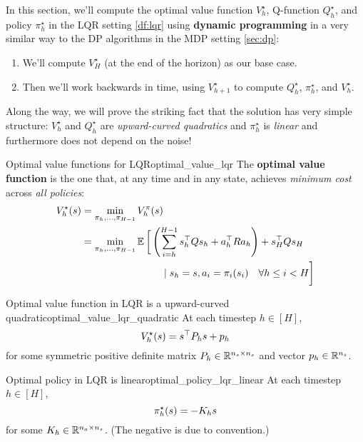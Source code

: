\documentclass[\main/main]{subfiles}
\begin{document}
In this section, we'll compute the optimal value function $V^\star_h$, Q-function $Q^\star_h$, and policy $\pi^\star_h$ in the LQR setting \eqref{df:lqr} using \textbf{dynamic programming} in a very similar way to the DP algorithms in the MDP setting \eqref{sec:dp}:
\begin{enumerate}
    \item We'll compute $V_H^\star$ (at the end of the horizon) as our base case.
    \item Then we'll work backwards in time, using $V_{h+1}^\star$ to compute $Q_h^\star$, $\pi_{h}^\star$, and $V_h^\star$.
\end{enumerate}
Along the way, we will prove the striking fact that the solution has very simple structure: $V_h^\star$ and $Q^\star_h$ are \emph{upward-curved quadratics} and $\pi_h^\star$ is \emph{linear} and furthermore does not depend on the noise!

\begin{definition}[breakable=false]{Optimal value functions for LQR}{optimal_value_lqr}
    The \textbf{optimal value function} is the one that, at any time and in any state,
    achieves \emph{minimum cost} across \emph{all policies}: \[
        \begin{split}
            V^\star_h(s) &= \min_{\pi_h, \dots, \pi_{H-1}} V^\pi_h(s) \\
            &= \min_{\pi_{h}, \dots, \pi_{H-1}} \operatorname*{\mathbb{E}} \bigg[ \left( \sum_{i=h}^{H-1} s_h^\top Q s_h + a_h^\top R a_h \right) + s_H^\top Q s_H \\
                &\hspace{8em} \mid s_h = s, a_i = \pi_i(s_i) \quad \forall h \le i < H \bigg] \\
        \end{split}
    \]
\end{definition}

\begin{theorem}{Optimal value function in LQR is a upward-curved quadratic}{optimal_value_lqr_quadratic}
    At each timestep $h \in [H]$,
    \[
        V^\star_h(s) = s^\top P_h s + p_h
    \]
    for some symmetric positive definite matrix $P_h \in \mathbb{R}^{n_s \times n_s}$ and vector $p_h \in \mathbb{R}^{n_s}$.
\end{theorem}

\begin{theorem}{Optimal policy in LQR is linear}{optimal_policy_lqr_linear}
    At each timestep $h \in [H]$,
    \[
        \pi^\star_h (s) = - K_h s
    \]
    for some $K_h \in \mathbb{R}^{n_a \times n_s}$. (The negative is due to convention.)
\end{theorem}
\end{document}
